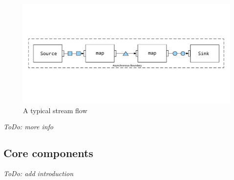 \begin{figure}
\centering\includegraphics[width=.7\textwidth]{img/akka-streams-1}
\caption{A typical stream flow}\label{img:streams-1}
\end{figure}


\textit{ToDo: more info}


\subsection{Core components}

\textit{ToDo: add introduction}

